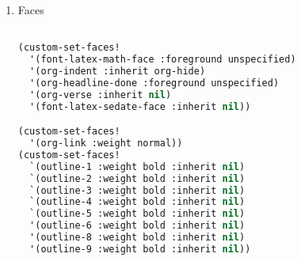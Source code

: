 \documentclass[11pt]{article}
\begin{document}
\begin{enumerate}
\begin{enumerate}
\begin{lstlisting}[language=Lisp]%! Someone please complete this list for me

(after! mixed-pitch
  (add-to-list 'mixed-pitch-fixed-pitch-faces 'org-list-dt))
\end{lstlisting}
  \item Fontify counter cookies
  \label{sec:fontify-counter-cookies}

  \begin{lstlisting}[language=Lisp]%! Someone please complete this list for me

(defun org-fontify-counter-cookies ()
  (setq
   org-font-lock-extra-keywords
   (append org-font-lock-extra-keywords
           '(("^[ \t]*\\(?:[-+*]\\|\\(?:[0-9]+\\|[a-zA-Z]\\)[.)]\\)[ \t]+\\(\\[@\\(?:start:\\)?\\(?:[0-9]+\\|[a-zA-Z]\\)\\]\\)"
              (1 'org-property-value prepend))))))

(add-hook 'org-font-lock-set-keywords-hook #'org-fontify-counter-cookies)
\end{lstlisting}
\end{enumerate}

  \item Faces
  \label{sec:faces-1}

  \begin{lstlisting}[language=Lisp]%! Someone please complete this list for me

(custom-set-faces!
  '(font-latex-math-face :foreground unspecified)
  '(org-indent :inherit org-hide)
  '(org-headline-done :foreground unspecified)
  '(org-verse :inherit nil)
  '(font-latex-sedate-face :inherit nil))

(custom-set-faces!
  '(org-link :weight normal))
(custom-set-faces!
  `(outline-1 :weight bold :inherit nil)
  `(outline-2 :weight bold :inherit nil)
  `(outline-3 :weight bold :inherit nil)
  `(outline-4 :weight bold :inherit nil)
  `(outline-5 :weight bold :inherit nil)
  '(outline-6 :weight bold :inherit nil)
  '(outline-8 :weight bold :inherit nil)
  '(outline-9 :weight bold :inherit nil))
\end{lstlisting}
\end{enumerate}
\end{document}
